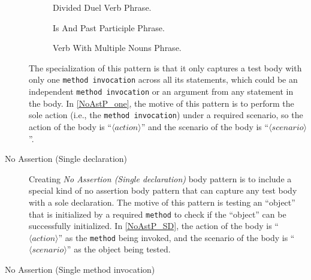 \documentclass[proposal.tex]{subfiles}
\begin{document}
\begin{description}
\begin{figure}[H]
\centering
    \begin{subfigure}{0.65\textwidth}
    \end{subfigure}
\caption{Divided Duel Verb Phrase.}
\label{fig:divided-dual-verb}
\end{figure}

\begin{figure}[H]
\centering
    \begin{subfigure}{0.65\textwidth}
    \end{subfigure}
\caption{Is And Past Participle Phrase.}
\label{fig:IsAndPast}
\end{figure}

\begin{figure}[H]
\centering
    \begin{subfigure}{0.65\textwidth}
    \end{subfigure}
\caption{Verb With Multiple Nouns Phrase.}
\label{fig:name_vmn}
\end{figure}

The specialization of this pattern is that it only captures a test body with only one \texttt{method invocation} across all its statements, which could be an independent \texttt{method invocation} or an argument from any statement in the body.
%
In \cref{NoAstP_one}, the motive of this pattern is to perform the sole action (i.e., the \texttt{method invocation}) under a required scenario, so the action of the body is \enquote{$\langle action \rangle$} and the scenario of the body is \enquote{$\langle scenario \rangle$}.


\item[No Assertion (Single declaration)]


Creating \textit{No Assertion (Single declaration)} body pattern is to include a special kind of no assertion body pattern that can capture any test body with a sole declaration.
%
The motive of this pattern is testing an \enquote{object} that is initialized by a required \texttt{method} to check if the \enquote{object} can be successfully initialized.
%
In \cref{NoAstP_SD}, the action of the body is \enquote{$\langle action \rangle$} as the \texttt{method} being invoked, and the scenario of the body is \enquote{$\langle scenario \rangle$} as the object being tested.

\item[No Assertion (Single method invocation)]



\end{description}
\end{document}
